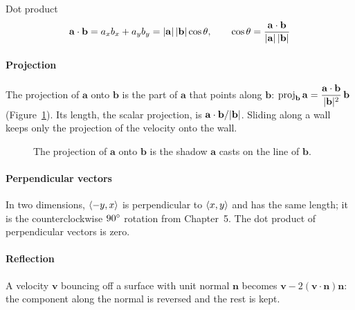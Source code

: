 \begin{keybox}{Dot product}
\[
\mathbf{a} \cdot \mathbf{b} = a_x b_x + a_y b_y = \lvert \mathbf{a} \rvert\,\lvert \mathbf{b} \rvert\cos\theta, \qquad
\cos\theta = \frac{\mathbf{a} \cdot \mathbf{b}}{\lvert \mathbf{a} \rvert\,\lvert \mathbf{b} \rvert}
\]
\end{keybox}

\paragraph{Projection} The projection of $\mathbf{a}$ onto $\mathbf{b}$ is the part of $\mathbf{a}$ that points along $\mathbf{b}$: $\operatorname{proj}_{\mathbf{b}}\mathbf{a} = \dfrac{\mathbf{a} \cdot \mathbf{b}}{\lvert \mathbf{b} \rvert^2}\,\mathbf{b}$ (Figure~\ref{fig:proj}). Its length, the scalar projection, is $\mathbf{a} \cdot \mathbf{b} / \lvert \mathbf{b} \rvert$. Sliding along a wall keeps only the projection of the velocity onto the wall.

\begin{figure}[H]
\centering
{}
\caption{The projection of $\mathbf{a}$ onto $\mathbf{b}$ is the shadow $\mathbf{a}$ casts on the line of $\mathbf{b}$.}
\label{fig:proj}
\end{figure}

\paragraph{Perpendicular vectors} In two dimensions, $\langle -y, x \rangle$ is perpendicular to $\langle x, y \rangle$ and has the same length; it is the counterclockwise $90^\circ$ rotation from Chapter~5. The dot product of perpendicular vectors is zero.

\paragraph{Reflection} A velocity $\mathbf{v}$ bouncing off a surface with unit normal $\mathbf{n}$ becomes $\mathbf{v} - 2(\mathbf{v} \cdot \mathbf{n})\mathbf{n}$: the component along the normal is reversed and the rest is kept.

